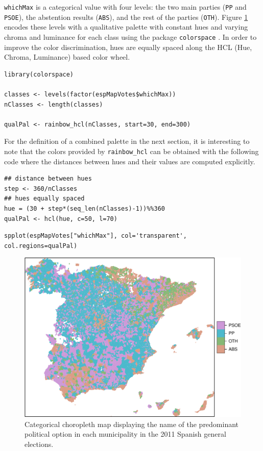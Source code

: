 \documentclass[smallroyalvopaper]{memoir}
\begin{document}
\texttt{whichMax} is a categorical value with four levels: the two main
parties (\texttt{PP} and \texttt{PSOE}), the abstention results (\texttt{ABS}), and the
rest of the parties (\texttt{OTH}). Figure \ref{fig:whichMax} encodes these levels
with a qualitative palette with constant hues and varying chroma and
luminance for each class using the package \texttt{colorspace}
\cite{Zeileis.Hornik.ea2009}. In order to improve the color
discrimination, hues are equally spaced along the HCL (Hue, Chroma,
Luminance) based color wheel.

\lstset{language=R,numbers=none}
\begin{lstlisting}
library(colorspace)  

classes <- levels(factor(espMapVotes$whichMax))
nClasses <- length(classes)

qualPal <- rainbow_hcl(nClasses, start=30, end=300)
\end{lstlisting}

For the definition of a combined palette in the next section, it is
interesting to note that the colors provided by \texttt{rainbow\_hcl} can be
obtained with the following code where the distances between hues and
their values are computed explicitly.
\lstset{language=R,numbers=none}
\begin{lstlisting}
## distance between hues
step <- 360/nClasses 
## hues equally spaced
hue = (30 + step*(seq_len(nClasses)-1))%%360 
qualPal <- hcl(hue, c=50, l=70)
\end{lstlisting}

\lstset{language=R,numbers=none}
\begin{lstlisting}
spplot(espMapVotes["whichMax"], col='transparent', col.regions=qualPal)
\end{lstlisting}

\begin{figure}[htb]
\centering
\includegraphics[width=.9\linewidth]{figs/whichMax.pdf}
\caption{\label{fig:whichMax}Categorical choropleth map displaying the name of the predominant political option in each municipality in the 2011 Spanish general elections.}
\end{figure}
\end{document}
